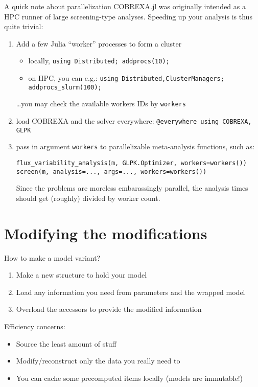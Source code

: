 \documentclass[aspectratio=169]{beamer}
\begin{document}
\begin{frame}[fragile]{A quick note about parallelization}
COBREXA.jl was originally intended as a HPC runner of large screening-type analyses. Speeding up your analysis is thus quite trivial:

\begin{enumerate}\small
\item Add a few Julia ``worker'' processes to form a cluster
  \begin{itemize}\scriptsize
  \item locally, \verb|using Distributed; addprocs(10);|
  \item on HPC, you can e.g.: \verb|using Distributed,ClusterManagers; addprocs_slurm(100);|
  \end{itemize}
  \dots you may check the available workers IDs by \verb|workers|
\item load COBREXA and the solver everywhere: \verb|@everywhere using COBREXA, GLPK|
  \item pass in argument \verb|workers| to parallelizable meta-analysis functions, such as:
\begin{verbatim}flux_variability_analysis(m, GLPK.Optimizer, workers=workers())
screen(m, analysis=..., args=..., workers=workers())\end{verbatim}
  Since the problems are moreless embarassingly parallel, the analysis times should get (roughly) divided by worker count.
\end{enumerate}
\end{frame}

\section{Modifying the modifications}

\begin{frame}{How to make a model variant?}
\begin{enumerate}
\item Make a new structure to hold your model
\item Load any information you need from parameters and the wrapped model
\item Overload the accessors to provide the modified information
\end{enumerate}

Efficiency concerns:
\begin{itemize}
\item Source the least amount of stuff
\item Modify/reconstruct only the data you really need to
\item You can cache some precomputed items locally (models are immutable!)
\end{itemize}
\end{frame}
\end{document}
